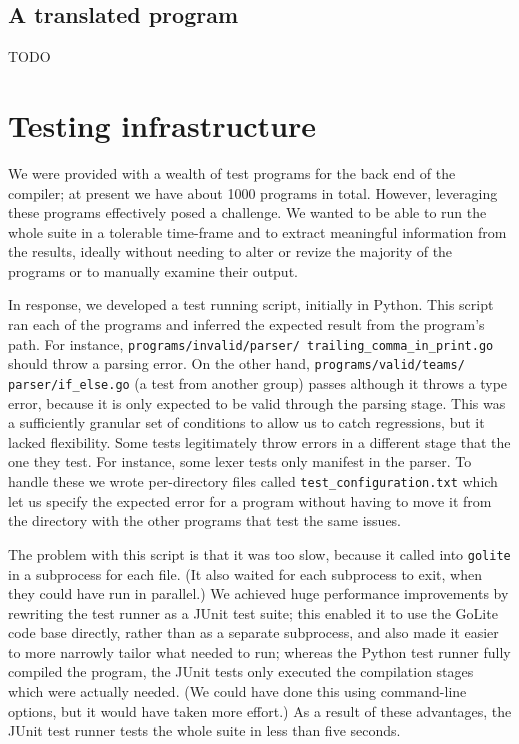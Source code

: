 \documentclass[oneside]{article}
\begin{document}
\subsection{A translated program}
TODO

\section{Testing infrastructure}
We were provided with a wealth of test programs for the back end of the compiler; at present we have about 1000 programs in total. However, leveraging these programs effectively posed a challenge. We wanted to be able to run the whole suite in a tolerable time-frame and to extract meaningful information from the results, ideally without needing to alter or revize the majority of the programs or to manually examine their output.

In response, we developed a test running script, initially in Python. This script ran each of the programs and inferred the expected result from the program's path. For instance, \texttt{programs/invalid/parser/ trailing\_comma\_in\_print.go} should throw a parsing error. On the other hand, \texttt{programs/valid/teams/ parser/if\_else.go} (a test from another group) passes although it throws a type error, because it is only expected to be valid through the parsing stage. This was a sufficiently granular set of conditions to allow us to catch regressions, but it lacked flexibility. Some tests legitimately throw errors in a different stage that the one they test. For instance, some lexer tests only manifest in the parser. To handle these we wrote per-directory files called \texttt{test\_configuration.txt} which let us specify the expected error for a program without having to move it from the directory with the other programs that test the same issues.

The problem with this script is that it was too slow, because it called into \texttt{golite} in a subprocess for each file. (It also waited for each subprocess to exit, when they could have run in parallel.) We achieved huge performance improvements by rewriting the test runner as a JUnit test suite; this enabled it to use the GoLite code base directly, rather than as a separate subprocess, and also made it easier to more narrowly tailor what needed to run; whereas the Python test runner fully compiled the program, the JUnit tests only executed the compilation stages which were actually needed. (We could have done this using command-line options, but it would have taken more effort.) As a result of these advantages, the JUnit test runner tests the whole suite in less than five seconds.
\end{document}
